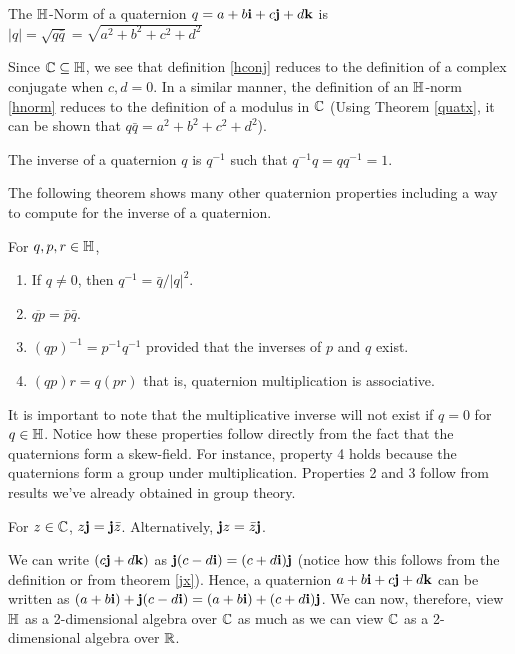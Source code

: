 \begin{definition}[$\HH$-Norm] \label{hnorm}
	The $\HH$-Norm of a quaternion $q = a + b\textbf{i} + c\textbf{j} + d\textbf{k}$ is $|q| = \sqrt{q\bar{q}} = \sqrt{a^2+b^2+c^2+d^2}$
\end{definition}
	
	Since $\operatorname{\mathbb{C}} \subseteq \operatorname{\mathbb{H}}$, we see that definition \ref{hconj} reduces to the definition of a complex conjugate when $c,d = 0$. In a similar manner, the definition of an $\HH$-norm \ref{hnorm} reduces to the definition of a modulus in $\operatorname{\mathbb{C}}$ (Using Theorem \ref{quatx}, it can be shown that $q\bar{q} = a^2+b^2+c^2+d^2$).

\begin{definition}[Inverse]
	The inverse of a quaternion $q$ is $q^{-1}$ such that $q^{-1}q = qq^{-1} = 1$.
\end{definition}
	
	The following theorem shows many other quaternion properties including a way to compute for the inverse of a quaternion.

\begin{theorem}
For $q, p, r \in \operatorname{\mathbb{H}}$,
	\begin{enumerate}
		\item If $q\neq 0$, then $q^{-1} = \bar{q}/|q|^2$.
		\item $\overline{qp} = \bar{p}\bar{q}$.
		\item $(qp)^{-1} = p^{-1}q^{-1}$ provided that the inverses of $p$ and $q$ exist. 
		\item $(qp)r = q(pr)$ that is, quaternion multiplication is associative.
	\end{enumerate}
\end{theorem}
It is important to note that the multiplicative inverse will not exist if $q = 0$ for $q \in \operatorname{\mathbb{H}}$. Notice how these properties follow directly from the fact that the quaternions form a skew-field. For instance, property 4 holds because the quaternions form a group under multiplication. Properties 2 and 3 follow from results we've already obtained in group theory. 

\begin{theorem} \label{jx}
	For $z \in \operatorname{\mathbb{C}}$, $z\textbf{j} = \textbf{j}\bar{z}$. Alternatively, $\textbf{j} z = \bar{z}\textbf{j}$. \cite{aslaksen}
\end{theorem}

We can write $(c\textbf{j}+d\textbf{k})$ as $\textbf{j}(c-d\textbf{i}) = (c+d\textbf{i})\textbf{j}$ (notice how this follows from the definition or from theorem \ref{jx}). Hence, a quaternion $a + b\textbf{i} + c\textbf{j} + d\textbf{k}$ can be written as $(a+b\textbf{i})+\textbf{j}(c-d\textbf{i}) = (a+b\textbf{i})+(c+d\textbf{i})\textbf{j}$. We can now, therefore, view $\HH$ as a 2-dimensional algebra over $\operatorname{\mathbb{C}}$ \cite{stamaria} as much as we can view $\operatorname{\mathbb{C}}$ as a 2-dimensional algebra over $\operatorname{\mathbb{R}}$.

